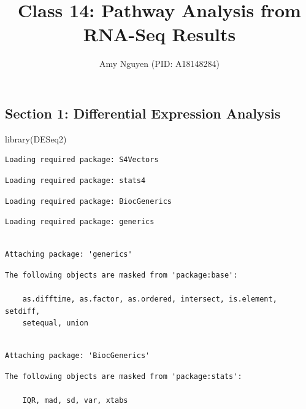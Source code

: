 \documentclass[
  letterpaper,
  DIV=11,
  numbers=noendperiod]{scrartcl}
\title{Class 14: Pathway Analysis from RNA-Seq Results}
\author{Amy Nguyen (PID: A18148284)}
\date{}
\newenvironment{Shaded}{\begin{snugshade}}{\end{snugshade}}
\newcommand{\FunctionTok}[1]{\textcolor[rgb]{0.28,0.35,0.67}{#1}}
\newcommand{\NormalTok}[1]{\textcolor[rgb]{0.00,0.23,0.31}{#1}}
\renewcommand*\contentsname{Table of contents}
\newcommand\contentsname{Table of contents}
\begin{document}
\maketitle

\renewcommand*\contentsname{Table of contents}
{
\hypersetup{linkcolor=}
\setcounter{tocdepth}{3}
\tableofcontents
}

\subsection{Section 1: Differential Expression
Analysis}\label{section-1-differential-expression-analysis}

\begin{Shaded}
\begin{Highlighting}[]
\FunctionTok{library}\NormalTok{(DESeq2)}
\end{Highlighting}
\end{Shaded}

\begin{verbatim}
Loading required package: S4Vectors
\end{verbatim}

\begin{verbatim}
Loading required package: stats4
\end{verbatim}

\begin{verbatim}
Loading required package: BiocGenerics
\end{verbatim}

\begin{verbatim}
Loading required package: generics
\end{verbatim}

\begin{verbatim}

Attaching package: 'generics'
\end{verbatim}

\begin{verbatim}
The following objects are masked from 'package:base':

    as.difftime, as.factor, as.ordered, intersect, is.element, setdiff,
    setequal, union
\end{verbatim}

\begin{verbatim}

Attaching package: 'BiocGenerics'
\end{verbatim}

\begin{verbatim}
The following objects are masked from 'package:stats':

    IQR, mad, sd, var, xtabs
\end{verbatim}
\end{document}
